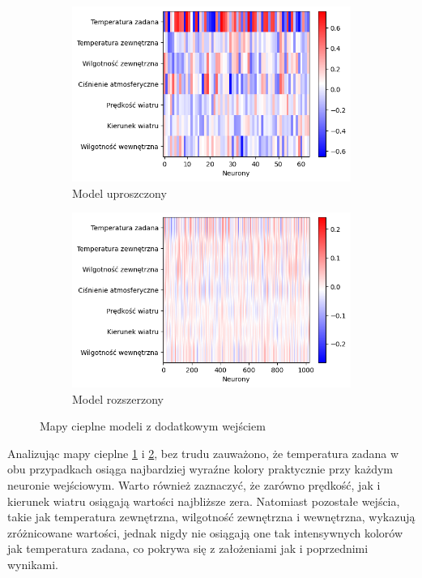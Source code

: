 \documentclass[a4paper,twoside,12pt]{book}
\begin{document}
\begin{figure}[!h]
  \centering
  \begin{subfigure}{0.42\textwidth}
    \includegraphics[width=\textwidth]{img/heatmap1_zdodatkowym.png}
    \caption{Model uproszczony}
    \label{lewy-gorny}
  \end{subfigure}
  \hfill
  \begin{subfigure}{0.42\textwidth}
    \includegraphics[width=\textwidth]{img/heatmap2_zdodatkowym.png}
    \caption{Model rozszerzony}
    \label{prawy-gorny}
  \end{subfigure}
  \caption{Mapy cieplne modeli z dodatkowym wejściem}
  \label{fig:wiele-rysunkow}
\end{figure}

\newpage
Analizując mapy cieplne \ref{lewy-gorny} i \ref{prawy-gorny}, bez trudu zauważono, że temperatura zadana w obu przypadkach osiąga najbardziej wyraźne kolory praktycznie przy każdym neuronie wejściowym. Warto również zaznaczyć, że zarówno prędkość, jak i kierunek wiatru osiągają wartości najbliższe zera. Natomiast pozostałe wejścia, takie jak temperatura zewnętrzna, wilgotność zewnętrzna i wewnętrzna, wykazują zróżnicowane wartości, jednak nigdy nie osiągają one tak intensywnych kolorów jak temperatura zadana, co pokrywa się z założeniami jak i poprzednimi wynikami.
\end{document}
